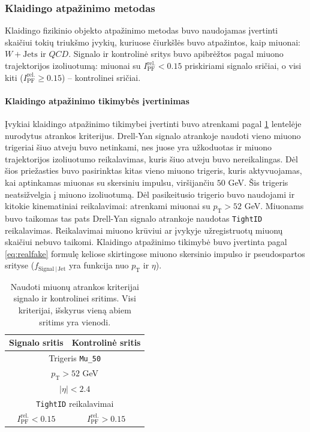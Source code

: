 \documentclass[a4paper, 12pt, oneside]{article}
\newcommand{\ttt}[1]{\texttt{#1}}
\newcommand{\pT}{p_{\mathrm{T}}}
\newcommand{\WJets}{W\! +\!\mathrm{Jets}}
\newcommand{\QCD}{QC\! D}
\newlength\q
\begin{document}
\subsubsection{Klaidingo atpažinimo metodas}

Klaidingo fizikinio objekto atpažinimo metodas buvo naudojamas įvertinti skaičiui tokių triukšmo įvykių, kuriuose čiurkšlės
buvo atpažintos, kaip miuonai: $\WJets$ ir $\QCD$.
Signalo ir kontrolinė sritys buvo apibrėžtos pagal miuono trajektorijos izoliuotumą: miuonai su $I_{\mathrm{PF}}^{\mathrm{rel.}}<0.15$
priskiriami signalo sričiai, o visi kiti ($I_{\mathrm{PF}}^{\mathrm{rel.}} \geqslant 0.15$) -- kontrolinei sričiai.

\paragraph{Klaidingo atpažinimo tikimybės įvertinimas\\}

Įvykiai klaidingo atpažinimo tikimybei įvertinti buvo atrenkami pagal \ref{table:FR} lentelėje nurodytus atrankos kriterijus.
Drell-Yan signalo atrankoje naudoti vieno miuono trigeriai šiuo atveju buvo netinkami, nes juose yra užkoduotas ir miuono trajektorijos
izoliuotumo reikalavimas, kuris šiuo atveju buvo nereikalingas.
Dėl šios priežasties buvo pasirinktas kitas vieno miuono trigeris, kuris aktyvuojamas, kai aptinkamas miuonas su skersiniu impulsu,
viršijančiu $50$ GeV. Šis trigeris neatsižvelgia į miuono izoliuotumą.
Dėl pasikeitusio trigerio buvo naudojami ir kitokie kinematiniai reikalavimai: atrenkami miuonai su $\pT>52$ GeV.
Miuonams buvo taikomas tas pats Drell-Yan signalo atrankoje naudotas \ttt{TightID} reikalavimas.
Reikalavimai miuono krūviui ar įvykyje užregistruotų miuonų skaičiui nebuvo taikomi.
Klaidingo atpažinimo tikimybė buvo įvertinta pagal \ref{eq:realfake} formulę keliose skirtingose miuono skersinio impulso ir
pseudospartos srityse ($f_{\mathrm{Signal} \, | \, \mathrm{Jet}}$ yra funkcija nuo $\pT$ ir $\eta$).

\begin{table}
	\begin{tabular}{|c|c|}
		\hline
		\textbf{Signalo sritis} & \textbf{Kontrolinė sritis} \\
		\hline\hline
		\multicolumn{2}{|c|}{Trigeris \ttt{Mu\_50}} \\
		\hline
		\multicolumn{2}{|c|}{$\pT>52$ GeV} \\
		\hline
		\multicolumn{2}{|c|}{$|\eta|<2.4$} \\
		\hline
		\multicolumn{2}{|c|}{\ttt{TightID} reikalavimai} \\
		\hline
		$I_{\mathrm{PF}}^{\mathrm{rel.}} < 0.15$ & $I_{\mathrm{PF}}^{\mathrm{rel.}} > 0.15$ \\
		\hline
	\end{tabular}
	\caption{\label{table:FR} Naudoti miuonų atrankos kriterijai signalo ir kontrolinei sritims. Visi kriterijai, išskyrus vieną
	abiem sritims yra vienodi.}
\end{table}
\end{document}
